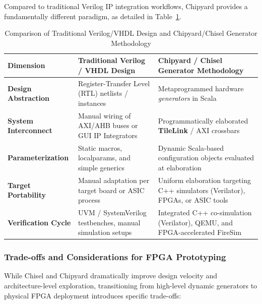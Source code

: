 \documentclass[12pt,a4paper]{article}
\begin{document}
Compared to traditional Verilog IP integration workflows, Chipyard provides a fundamentally different paradigm, as detailed in Table~\ref{tab:chipyard_vs_verilog}.

\begin{table}[htbp]
    \centering
    \caption{Comparison of Traditional Verilog/VHDL Design and Chipyard/Chisel Generator Methodology}
    \label{tab:chipyard_vs_verilog}
    \vspace{0.2cm}
    \small
    \begin{tabular}{p{} p{} p{}}
        \toprule
        \textbf{Dimension} & \textbf{Traditional Verilog / VHDL Design} & \textbf{Chipyard / Chisel Generator Methodology} \\
        \midrule
        \textbf{Design Abstraction} & Register-Transfer Level (RTL) netlists / instances & Metaprogrammed hardware \textit{generators} in Scala \\
        \addlinespace
        \textbf{System Interconnect} & Manual wiring of AXI/AHB buses or GUI IP Integrators & Programmatically elaborated \textbf{TileLink} / AXI crossbars \\
        \addlinespace
        \textbf{Parameterization} & Static macros, localparams, and simple generics & Dynamic Scala-based configuration objects evaluated at elaboration \\
        \addlinespace
        \textbf{Target Portability} & Manual adaptation per target board or ASIC process & Uniform elaboration targeting C++ simulators (Verilator), FPGAs, or ASIC tools \\
        \addlinespace
        \textbf{Verification Cycle} & UVM / SystemVerilog testbenches, manual simulation setups & Integrated C++ co-simulation (Verilator), QEMU, and FPGA-accelerated FireSim \\
        \bottomrule
    \end{tabular}
\end{table}

\subsubsection{Trade-offs and Considerations for FPGA Prototyping}
While Chisel and Chipyard dramatically improve design velocity and architecture-level exploration, transitioning from high-level dynamic generators to physical FPGA deployment introduces specific trade-offs:
\end{document}
